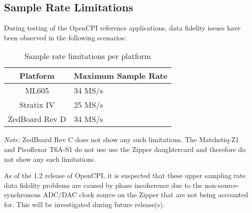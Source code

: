 \subsection*{Sample Rate Limitations}
During testing of the OpenCPI reference applications, data fidelity issues have been observed in the following scenarios:
\begin{table}[H]

		\label{table:samplelimits}
		\begin{tabularx}{\textwidth}{|c|X|}
			\hline
			\rowcolor{blue}
			\textbf{Platform} & \textbf{Maximum Sample Rate} \\
			\hline
			ML605 & 34 MS/s\\
			\hline
			Stratix IV & 25 MS/s\\
			\hline
			ZedBoard Rev D & 34 MS/s\\
		    \hline
		\end{tabularx}
		\caption{Sample rate limitations per platform}

		\textit{Note: } ZedBoard Rev C does not show any such limitations. The Matchstiq-Z1 and Picoflexor T6A-S1 do not use use the Zipper daughtercard and therefore do not show any such limitations.
\end{table}

\noindent As of the 1.2 release of OpenCPI, it is suspected that these upper sampling rate data fidelity problems are caused by phase incoherence due to the non-source-synchronous ADC/DAC clock source on the Zipper that are not being accounted for. This will be investigated during future release(s).
